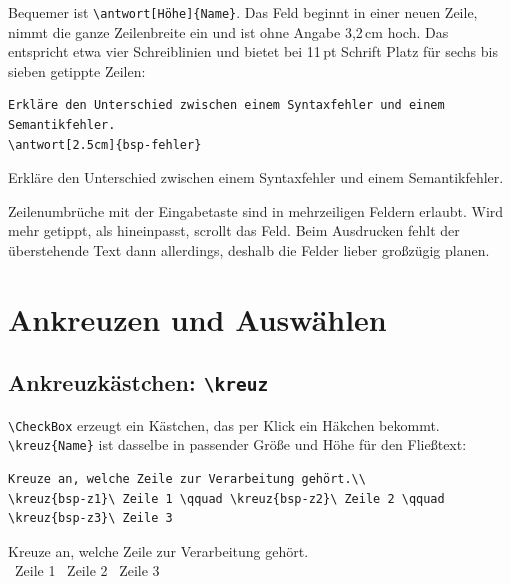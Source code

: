 \begin{Form}
\begin{ausgabe}
\TextField[name=bsp-frei, multiline=true, width=12cm, height=2cm]{}
\end{ausgabe}


Bequemer ist \verb|\antwort[Höhe]{Name}|. Das Feld beginnt in einer neuen
Zeile, nimmt die ganze Zeilenbreite ein und ist ohne Angabe 3,2\,cm hoch. Das
entspricht etwa vier Schreiblinien und bietet bei 11\,pt Schrift Platz für
sechs bis sieben getippte Zeilen:

\begin{lstlisting}[style=latex]
Erkläre den Unterschied zwischen einem Syntaxfehler und einem
Semantikfehler.
\antwort[2.5cm]{bsp-fehler}
\end{lstlisting}

\begin{ausgabe}
Erkläre den Unterschied zwischen einem Syntaxfehler und einem
Semantikfehler.
\end{ausgabe}


Zeilenumbrüche mit der Eingabetaste sind in mehrzeiligen Feldern erlaubt. Wird
mehr getippt, als hineinpasst, scrollt das Feld. Beim Ausdrucken fehlt der
überstehende Text dann allerdings, deshalb die Felder lieber großzügig planen.



\section{Ankreuzen und Auswählen}

\subsection{Ankreuzkästchen: \texttt{\textbackslash kreuz}}

\verb|\CheckBox| erzeugt ein Kästchen, das per Klick ein Häkchen bekommt.
\verb|\kreuz{Name}| ist dasselbe in passender Größe und Höhe für den
Fließtext:

\begin{lstlisting}[style=latex]
Kreuze an, welche Zeile zur Verarbeitung gehört.\\
\kreuz{bsp-z1}\ Zeile 1 \qquad \kreuz{bsp-z2}\ Zeile 2 \qquad
\kreuz{bsp-z3}\ Zeile 3
\end{lstlisting}

\begin{ausgabe}
Kreuze an, welche Zeile zur Verarbeitung gehört.\\
\ Zeile 1 \qquad {}\ Zeile 2 \qquad
{}\ Zeile 3
\end{ausgabe}



\end{Form}
